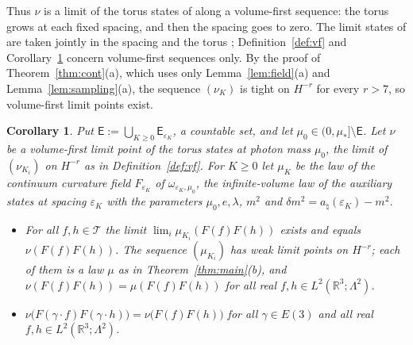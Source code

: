 \documentclass[11pt]{amsart}
\theoremstyle{plain}
\newtheorem{corollary}[theorem]{Corollary}
\theoremstyle{definition}
\theoremstyle{remark}
\numberwithin{equation}{section}
\newcommand{\R}{\mathbb{R}}
\newcommand{\eps}{\varepsilon}
\newcommand{\cT}{\mathcal{T}}
\newcommand{\Eu}{E(3)}
\begin{document}
Thus $\nu$ is a limit of the torus states of \cite{v1} along a volume-first sequence: the torus grows at each fixed spacing, and then the spacing goes to zero. The limit states of \cite[Thm.~3.1(ii)]{v1} are taken jointly in the spacing and the torus \cite[Rem.~3.3(a)]{v1}; Definition~\ref{def:vf} and Corollary~\ref{cor:torus} concern volume-first sequences only. By the proof of Theorem~\ref{thm:cont}(a), which uses only Lemma~\ref{lem:field}(a) and Lemma~\ref{lem:sampling}(a), the sequence $(\nu_K)$ is tight on $H^{-r}$ for every $r>7$, so volume-first limit points exist.

\begin{corollary}\label{cor:torus}
Put $\mathsf E:=\bigcup_{K\ge0}\mathsf E_{\eps_K}$, a countable set, and let $\mu_0\in(0,\mu_*]\setminus\mathsf E$. Let $\nu$ be a volume-first limit point of the torus states at photon mass $\mu_0$, the limit of $(\nu_{K_i})$ on $H^{-r}$ as in Definition~\ref{def:vf}. For $K\ge0$ let $\mu_K$ be the law of the continuum curvature field $F_{\eps_K}$ of $\omega_{\eps_K,\mu_0}$, the infinite-volume law of the auxiliary states at spacing $\eps_K$ with the parameters $\mu_0,e,\lambda$, $m^2$ and $\delta m^2=a_\natural(\eps_K)-m^2$.
\begin{itemize}
\item[(a)] For all $f,h\in\cT$ the limit $\lim_i\mu_{K_i}(F(f)F(h))$ exists and equals $\nu(F(f)F(h))$. The sequence $(\mu_{K_i})$ has weak limit points on $H^{-r}$; each of them is a law $\mu$ as in Theorem~\ref{thm:main}(b), and $\nu(F(f)F(h))=\mu(F(f)F(h))$ for all real $f,h\in L^2(\R^3;\Lambda^2)$.
\item[(b)] $\nu\big(F(\gamma\cdot f)F(\gamma\cdot h)\big)=\nu\big(F(f)F(h)\big)$ for all $\gamma\in\Eu$ and all real $f,h\in L^2(\R^3;\Lambda^2)$.
\end{itemize}
\end{corollary}
\end{document}
